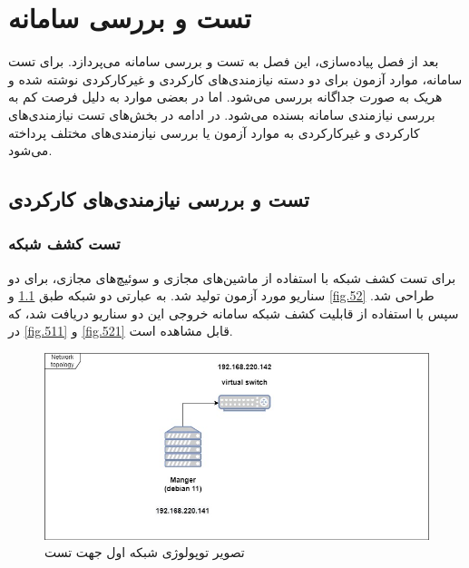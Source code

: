 \chapter{تست و بررسی سامانه}

بعد از فصل پیاده‌سازی، این فصل به تست و بررسی سامانه می‌پردازد. برای تست سامانه، موارد آزمون برای دو دسته نیازمندی‌های کارکردی و غیرکارکردی نوشته شده و هریک به صورت جداگانه بررسی می‌شود. اما در بعضی موارد به دلیل فرصت کم به بررسی نیازمندی‌ سامانه بسنده می‌شود. در ادامه در بخش‌های تست نیازمندی‌های کارکردی و غیرکارکردی به موارد آزمون یا بررسی نیازمندی‌های مختلف پرداخته می‌شود.

\section{تست و بررسی نیازمندی‌های کارکردی}

\subsection{تست کشف شبکه}
برای تست کشف شبکه با استفاده از ماشین‌های مجازی و سوئیچ‌های مجازی، برای دو سناریو مورد آزمون تولید شد. به عبارتی دو شبکه طبق \cref{fig.51} و \cref{fig.52} طراحی شد. سپس با استفاده از قابلیت کشف شبکه سامانه خروجی این دو سناریو دریافت شد، که در \cref{fig.511} و \cref{fig.521} قابل مشاهده است.




\begin{figure}[!h]
    \centering\includegraphics[scale=.38]{./topo-test1}
    \caption{تصویر توپولوژی شبکه اول جهت تست}\label{fig.51}
\end{figure}


